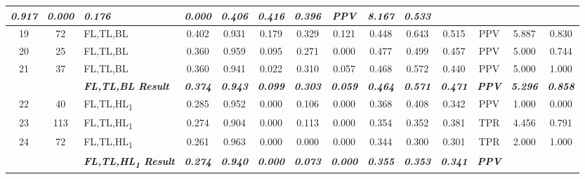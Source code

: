 \begin{table}[H]
{\begin{tabular}{cc|l|c|c|c|c|c|c|c|c|c|c|c|}
    \textit{\textbf{0.917}} &
    \textit{\textbf{0.000}} &
    \textit{\textbf{0.176}} &
    \textit{\textbf{0.000}} &
    \textit{\textbf{0.406}} &
    \textit{\textbf{0.416}} &
    \textit{\textbf{0.396}} &
    \textit{\textbf{PPV}} &
    \textit{\textbf{8.167}} &
    \textit{\textbf{0.533}} \\ \hline
  \multicolumn{1}{|c|}{19} &
    72 &
    FL,TL,BL &
    0.402 &
    0.931 &
    0.179 &
    0.329 &
    0.121 &
    0.448 &
    0.643 &
    0.515 &
    PPV &
    5.887 &
    0.830 \\ \hline
  \multicolumn{1}{|c|}{20} &
    25 &
    FL,TL,BL &
    0.360 &
    0.959 &
    0.095 &
    0.271 &
    0.000 &
    0.477 &
    0.499 &
    0.457 &
    PPV &
    5.000 &
    0.744 \\ \hline
  \multicolumn{1}{|c|}{21} &
    37 &
    FL,TL,BL &
    0.360 &
    0.941 &
    0.022 &
    0.310 &
    0.057 &
    0.468 &
    0.572 &
    0.440 &
    PPV &
    5.000 &
    1.000 \\ \hline
  \textit{\textbf{}} &
    \textit{\textbf{}} &
    \textit{\textbf{FL,TL,BL Result}} &
    \textit{\textbf{0.374}} &
    \textit{\textbf{0.943}} &
    \textit{\textbf{0.099}} &
    \textit{\textbf{0.303}} &
    \textit{\textbf{0.059}} &
    \textit{\textbf{0.464}} &
    \textit{\textbf{0.571}} &
    \textit{\textbf{0.471}} &
    \textit{\textbf{PPV}} &
    \textit{\textbf{5.296}} &
    \textit{\textbf{0.858}} \\ \hline
  \multicolumn{1}{|c|}{22} &
    40 &
    FL,TL,HL\textsubscript{1} &
    0.285 &
    0.952 &
    0.000 &
    0.106 &
    0.000 &
    0.368 &
    0.408 &
    0.342 &
    PPV &
    1.000 &
    0.000 \\ \hline
  \multicolumn{1}{|c|}{23} &
    113 &
    FL,TL,HL\textsubscript{1} &
    0.274 &
    0.904 &
    0.000 &
    0.113 &
    0.000 &
    0.354 &
    0.352 &
    0.381 &
    TPR &
    4.456 &
    0.791 \\ \hline
  \multicolumn{1}{|c|}{24} &
    72 &
    FL,TL,HL\textsubscript{1} &
    0.261 &
    0.963 &
    0.000 &
    0.000 &
    0.000 &
    0.344 &
    0.300 &
    0.301 &
    TPR &
    2.000 &
    1.000 \\ \hline
  \textit{\textbf{}} &
    \textit{\textbf{}} &
    \textit{\textbf{FL,TL,HL\textsubscript{1} Result}} &
    \textit{\textbf{0.274}} &
    \textit{\textbf{0.940}} &
    \textit{\textbf{0.000}} &
    \textit{\textbf{0.073}} &
    \textit{\textbf{0.000}} &
    \textit{\textbf{0.355}} &
    \textit{\textbf{0.353}} &
    \textit{\textbf{0.341}} &
    \textit{\textbf{PPV}} &

\end{tabular}}
\end{table}
